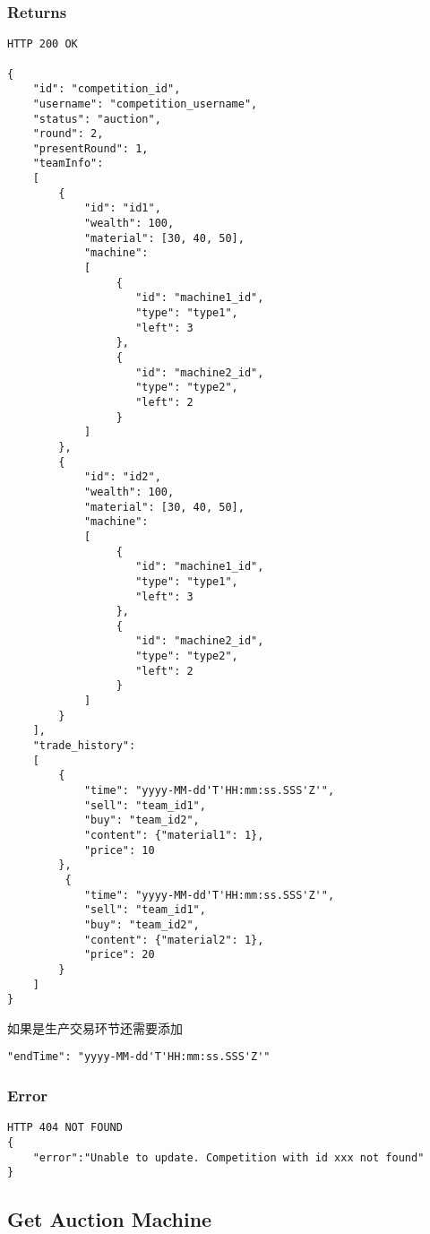 \documentclass{article}
\begin{document}
\subsubsection*{Returns}
\begin{lstlisting}
HTTP 200 OK

{
    "id": "competition_id",
    "username": "competition_username",
    "status": "auction",
    "round": 2,
    "presentRound": 1,
    "teamInfo":
    [
        {
            "id": "id1",
            "wealth": 100,
            "material": [30, 40, 50],
            "machine":
            [
                 {
                    "id": "machine1_id",
                    "type": "type1",
                    "left": 3
                 },
                 {
                    "id": "machine2_id",
                    "type": "type2",
                    "left": 2
                 }
            ]
        },
        {
            "id": "id2",
            "wealth": 100,
            "material": [30, 40, 50],
            "machine":
            [
                 {
                    "id": "machine1_id",
                    "type": "type1",
                    "left": 3
                 },
                 {
                    "id": "machine2_id",
                    "type": "type2",
                    "left": 2
                 }
            ]
        }
    ],
    "trade_history":
    [
        {
            "time": "yyyy-MM-dd'T'HH:mm:ss.SSS'Z'",
            "sell": "team_id1",
            "buy": "team_id2",
            "content": {"material1": 1},
            "price": 10
        },
         {
            "time": "yyyy-MM-dd'T'HH:mm:ss.SSS'Z'",
            "sell": "team_id1",
            "buy": "team_id2",
            "content": {"material2": 1},
            "price": 20
        }
    ]
}
\end{lstlisting}

如果是生产交易环节还需要添加
\begin{lstlisting}
"endTime": "yyyy-MM-dd'T'HH:mm:ss.SSS'Z'"
\end{lstlisting}

\subsubsection*{Error}
\begin{lstlisting}
HTTP 404 NOT FOUND
{
    "error":"Unable to update. Competition with id xxx not found"
}
\end{lstlisting}

\subsection{Get Auction Machine}
\end{document}
